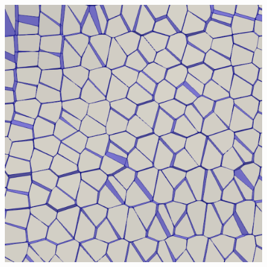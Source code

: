 \begin{figure}[h!]
{		\includegraphics[scale=0.09]{media/2-shabaka/3-clean-zoom/2-badfacets-zoom.png}
\label{fig:cross1-2}}
\end{figure}
